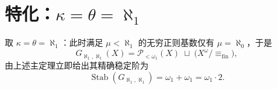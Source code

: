 \documentclass[11pt,a4paper]{ctexart}
\theoremstyle{definition}
\theoremstyle{plain}
\newcommand{\Stab}{\operatorname{Stab}}
\begin{document}
\section{特化：$\kappa = \theta = \aleph_1$}

取 $\kappa = \theta = \aleph_1$：此时满足 $\mu < \aleph_1$ 的无穷正则基数仅有 $\mu = \aleph_0$，于是
\[
  G_{\aleph_1, \aleph_1}(X) = \mathcal{P}_{<\omega_1}(X) \;\sqcup\; \bigl(X^\omega / {\equiv_{\mathrm{fin}}}\bigr),
\]
由上述主定理立即给出其精确稳定阶为
\[
  \Stab(G_{\aleph_1, \aleph_1}) = \omega_1 + \omega_1 = \omega_1 \cdot 2.
\]
\end{document}
